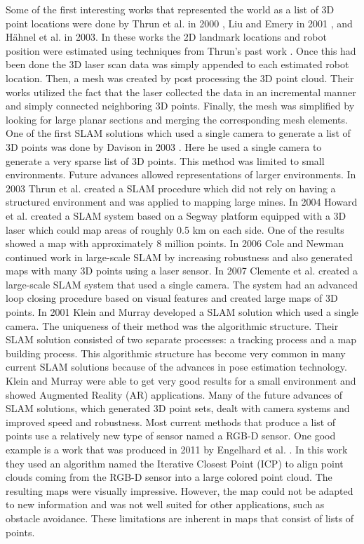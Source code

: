 Some of the first interesting works that represented the world as a list of 3D
point locations were done by Thrun et al. in 2000 \cite{Thrun2000}, Liu and
Emery in 2001 \cite{Liu2001}, and H\"{a}hnel et al. in 2003. In these works the
2D landmark locations and robot position were estimated using techniques from
Thrun's past work \cite{Thrun1998}. Once this had been done the 3D laser scan
data was simply appended to each estimated robot location. Then, a mesh was
created by post processing the 3D point cloud. Their works utilized the fact
that the laser collected the data in an incremental manner and simply connected
neighboring 3D points. Finally, the mesh was simplified by looking for large
planar sections and merging the corresponding mesh elements. One of the first
SLAM solutions which used a single camera to generate a list of 3D points was
done by Davison in 2003 \cite{Davison2003}. Here he used a single camera to
generate a very sparse list of 3D points. This method was limited to small
environments. Future advances allowed representations of larger environments. In
2003 Thrun et al. \cite{Thrun2003} created a SLAM procedure which did not rely
on having a structured environment and was applied to mapping large mines. In
2004 Howard et al. \cite{Howard2004} created a SLAM system based on a Segway
platform equipped with a 3D laser which could map areas of roughly 0.5 km on
each side. One of the results showed a map with approximately 8 million points.
In 2006 Cole and Newman \cite{Cole2006} continued work in large-scale SLAM by
increasing robustness and also generated maps with many 3D points using a laser
sensor. In 2007 Clemente et al. created a large-scale SLAM system that used a
single camera. The system had an advanced loop closing procedure based on visual
features and created large maps of 3D points. In 2001 Klein and Murray
\cite{Klein2007} developed a SLAM solution which used a single camera. The
uniqueness of their method was the algorithmic structure. Their SLAM solution
consisted of two separate processes: a tracking process and a map building
process. This algorithmic structure has become very common in many current SLAM
solutions because of the advances in pose estimation technology. Klein and
Murray were able to get very good results for a small environment and showed
Augmented Reality (AR) applications. Many of the future advances of SLAM
solutions, which generated 3D point sets, dealt with camera systems
\cite{Paz2008,Konolige2008,Strasdat2010} and improved speed and robustness. Most
current methods that produce a list of points use a relatively new type of
sensor named a RGB-D sensor. One good example is a work that was produced in
2011 by Engelhard et al. \cite{Engelhard2011}. In this work they used an
algorithm named the Iterative Closest Point (ICP) \cite{Rusinkiewicz} to align
point clouds coming from the RGB-D sensor into a large colored point cloud. The
resulting maps were visually impressive. However, the map could not be adapted
to new information and was not well suited for other applications, such as
obstacle avoidance. These limitations are inherent in maps that consist of lists
of points.

